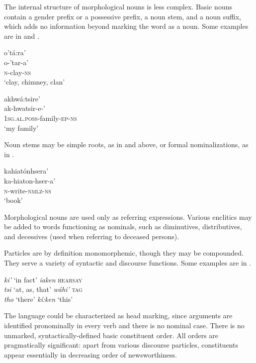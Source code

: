 \documentclass[output=paper,colorlinks,citecolor=brown]{langscibook}
\begin{document}
The internal structure of morphological nouns is less complex. Basic nouns contain a gender prefix or a possessive prefix, a noun stem, and a noun suffix, which adds no information beyond marking the word as a noun. Some examples are in  and .

\ea\label{ex:moh:9}
    \glll o’tá:ra’ \\ 
        o-’tar-a’ \\
         \textsc{n}-clay-\textsc{ns} \\
    \glt ‘clay, chimney, clan’
\z 

\ea\label{ex:moh:10}
    \glll akhwá:tsire’ \\ 
         ak-hwatsir-e-’ \\
         \textsc{1sg.al.poss}-family-\textsc{ep-ns} \\
    \glt ‘my family’
\z 

Noun stems may be simple roots, as in  and  above, or formal nominalizations, as in .

\ea\label{ex:moh:11}
    \glll kahiatónhsera’ \\ 
         ka-hiaton-hser-a’ \\
         \textsc{n}-write-\textsc{nmlz-ns} \\
    \glt ‘book’
\z 

Morphological nouns are used only as referring expressions. Various enclitics may be added to words functioning as nominals, such as diminutives, distributives, and decessives (used when referring to deceased persons).

Particles are by definition monomorphemic, though they may be compounded. They serve a variety of syntactic and discourse functions. Some examples are in .
 
\ea\label{ex:moh:12}
\textit{ki’} ‘in fact’ \tab \textit{iaken} \textsc{hearsay} \\
\textit{tsi} ‘at, as, that’ \tab \textit{wáhi’} \textsc{tag}\\
\textit{tho} ‘there’ \tab \textit{kí:ken} ‘this’\\
\z 

The language could be characterized as head marking, since arguments are identified pronominally in every verb and there is no nominal case. There is no unmarked, syntactically-defined basic constituent order. All orders are pragmatically significant: apart from various discourse particles, constituents appear essentially in decreasing order of newsworthiness.
\end{document}
